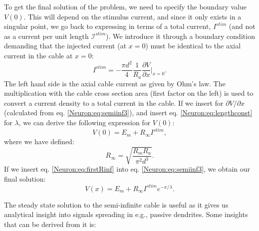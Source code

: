 To get the final solution of the problem, we need to specify the boundary value $V(0)$. This will depend on the stimulus current, and since it only exists in a singular point, we go back to expressing in terms of a total current, $I^{stim}$ (and not as a current per unit length $\mathcal{I}^{stim}$). We introduce it through a boundary condition demanding that the injected current (at $x=0$) must be identical to the axial current in the cable at $x=0$:
\begin{equation}
I^{stim} = - \frac{\pi d^2}{4}\frac{1}{R_a} \frac{\partial V}{\partial x}   \Big|_{x=0}.
\end{equation}
The left hand side is the axial cable current as given by Ohm's law. The multiplication with the cable cross section area (first factor on the left) is used to convert a current density to a total current in the cable. If we insert for $\partial V/\partial x$ (calculated from eq. \ref{Neuron:eq:semiinf3}), and insert eq. \ref{Neuron:eq:lengthconst} for $\lambda$, we can derive the following expression for $V(0)$:
\begin{equation}
V(0) = E_m + R_{\infty}I^{stim}, 
\label{Neuron:eq:firstRinf}
\end{equation}
where we have defined:
\begin{equation}
R_{\infty} = \sqrt{\frac{R_m R_a}{\pi^2 d^3}}.
\label{Neuron:eq:Rinf}
\end{equation}
If we insert eq. \ref{Neuron:eq:firstRinf} into eq. \ref{Neuron:eq:semiinf3}, we obtain our final solution:
\begin{equation}
V(x) = E_m +R_{\infty}I^{stim}  e^{-x/\lambda}.
\label{Neuron:eq:semiinf4}
\end{equation}

The steady state solution to the semi-infinite cable is useful as it gives us analytical insight into signals spreading in e.g., passive dendrites. Some insights that can be derived from it is:

